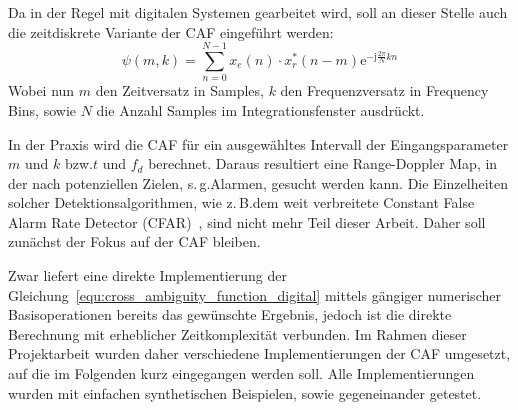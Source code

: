 Da in der Regel mit digitalen Systemen gearbeitet wird, soll an dieser Stelle auch die zeitdiskrete Variante der CAF eingeführt werden:%
%
\begin{equation}\label{equ:cross_ambiguity_function_digital}
    \psi(m, k) = \sum_{n = 0}^{N - 1}{x_{e}(n) \cdot x_{r}^{*}(n - m) \mathrm{e}^{-\mathrm{j} \frac{2 \pi}{N} k n}}
\end{equation}%
%
Wobei nun \(m\) den Zeitversatz in Samples, \(k\) den Frequenzversatz in Frequency Bins, sowie \(N\) die Anzahl Samples im Integrationsfenster ausdrückt.

In der Praxis wird die CAF für ein ausgewähltes Intervall der Eingangsparameter \(m\) und \(k\) bzw.\@ \(t\) und \(f_d\) berechnet. Daraus resultiert eine Range-Doppler Map, in der nach potenziellen Zielen, s.\,g.\@ Alarmen, gesucht werden kann. Die Einzelheiten solcher Detektionsalgorithmen, wie z.\,B.\@ dem weit verbreitete Constant False Alarm Rate Detector (CFAR)~\cite[S.~208--230]{Malanowski2019}, sind nicht mehr Teil dieser Arbeit. Daher soll zunächst der Fokus auf der CAF bleiben.

Zwar liefert eine direkte Implementierung der Gleichung~\ref{equ:cross_ambiguity_function_digital} mittels gängiger numerischer Basisoperationen bereits das gewünschte Ergebnis, jedoch ist die direkte Berechnung mit erheblicher Zeitkomplexität verbunden. Im Rahmen dieser Projektarbeit wurden daher verschiedene Implementierungen der CAF umgesetzt, auf die im Folgenden kurz eingegangen werden soll. Alle Implementierungen wurden mit einfachen synthetischen Beispielen, sowie gegeneinander getestet.

